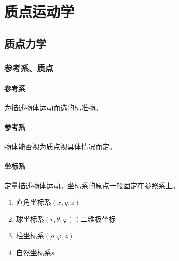 \documentclass[
	12pt, %
	a4paper, %
]{myLegrandOrangeBook}
\begin{document}

\chapterspaceabove{6.75cm} %
\chapterspacebelow{7.25cm} %


\chapter{质点运动学}

\section{质点力学}

\subsection{参考系、质点}

\subsubsection*{参考系}

    为描述物体运动而选的标准物。

\subsubsection*{参考系}

    物体能否视为质点视具体情况而定。

\subsubsection*{坐标系}

    定量描述物体运动。坐标系的原点一般固定在参照系上。

    \begin{enumerate}
        \item 直角坐标系\(\left(x,y,z\right)\)
        \item 球坐标系\(\left(r,\theta,\varphi\right)\)：二维极坐标
        \item 柱坐标系\(\left(\rho,\varphi,z\right)\)
        \item 自然坐标系\(s\)
    \end{enumerate}
\end{document}
